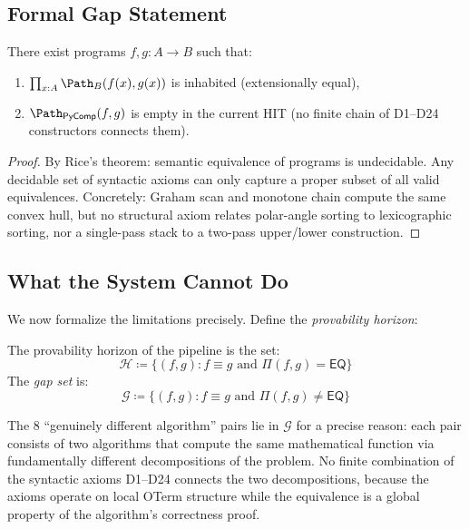 \subsection{Formal Gap Statement}

\begin{theorem}
\label{thm:gap}
There exist programs $f, g : A \to B$ such that:
\begin{enumerate}
  \item $\prod_{x:A} \Path_B(f(x), g(x))$ is inhabited
    (extensionally equal),
  \item $\Path_{\mathsf{PyComp}}(f, g)$ is empty in the current
    HIT (no finite chain of D1--D24 constructors connects them).
\end{enumerate}
\end{theorem}

\begin{proof}
By Rice's theorem: semantic equivalence of programs is undecidable.
Any decidable set of syntactic axioms can only capture a proper
subset of all valid equivalences.  Concretely: Graham scan and
monotone chain compute the same convex hull, but no structural
axiom relates polar-angle sorting to lexicographic sorting, nor
a single-pass stack to a two-pass upper/lower construction.
\end{proof}

\subsection{What the System Cannot Do}

We now formalize the limitations precisely.  Define the
\emph{provability horizon}:

\begin{definition}
\label{def:provability-horizon}
The provability horizon of the pipeline is the set:
\[
  \mathcal{H} \coloneqq \bigl\{(f, g) : f \equiv g \text{ and }
  \Pi(f, g) = \mathsf{EQ}\bigr\}
\]
The \emph{gap set} is:
\[
  \mathcal{G} \coloneqq \bigl\{(f, g) : f \equiv g \text{ and }
  \Pi(f, g) \neq \mathsf{EQ}\bigr\}
\]
\end{definition}

The 8 ``genuinely different algorithm'' pairs lie in $\mathcal{G}$
for a precise reason: each pair consists of two algorithms that
compute the same mathematical function via fundamentally different
decompositions of the problem.  No finite combination of the
syntactic axioms D1--D24 connects the two decompositions, because
the axioms operate on local OTerm structure while the equivalence
is a global property of the algorithm's correctness proof.

